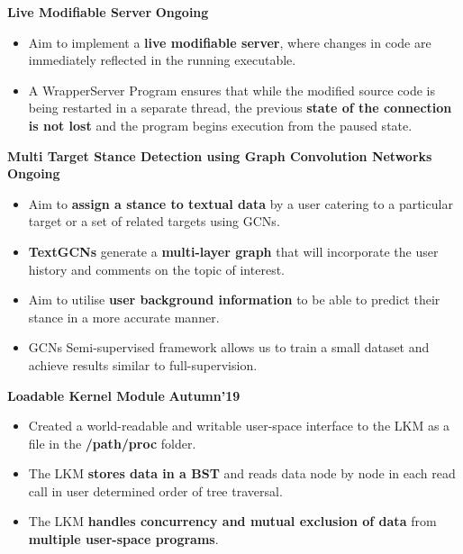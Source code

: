\documentclass[10pt]{article}
\begin{document}
\vspace{-0.5ex}
\spacedhrule{0.15ex}{1.0ex}
\large {\textbf{Live Modifiable Server}} \normalsize \href{}{} {\hfill} \textbf{Ongoing}\\[-1.75em]
\begin{itemize}
    \item Aim to implement a \textbf{live modifiable server}, where changes in code are immediately reflected in the running executable.\\[-1.9em]
    \item A WrapperServer Program ensures that while the modified source code is being restarted in a separate thread, the previous \textbf{state of the connection is not lost} and the program begins execution from the paused state.\\[-1em]
\end{itemize}
\large {\textbf{Multi Target Stance Detection using Graph Convolution Networks}} \normalsize \href{}{} {\hfill} \textbf{Ongoing}\\[-1.75em]
\begin{itemize}
    \item Aim to \textbf{assign a stance to textual data} by a user catering to a particular target or a set of related targets using GCNs.\\[-1.9em]
    \item \textbf{TextGCNs} generate a \textbf{multi-layer graph} that will incorporate the user history and comments on the topic of interest.\\[-1.9em]
    \item Aim to utilise \textbf{user background information} to be able to predict their stance in a more accurate manner.\\[-1.9em]
    \item GCNs {Semi-supervised framework} allows us to train a small dataset and achieve results similar to full-supervision.\\[-1em]
\end{itemize}
\large {\textbf{Loadable Kernel Module}} \normalsize \href{https://github.com/shmundhra/Systems-Programming/blob/master/LKM/LKM_BST.pdf} {\hspace{0.5ex}\faGithub} {\hfill} \textbf{Autumn'19}\\[-1.75em]
\begin{itemize}
    \item Created a world-readable and writable user-space interface to the LKM as a file in the \textbf{/path/proc} folder. \\[-1.9em]
    \item The LKM \textbf{stores data in a BST} and reads data node by node in each read call in user determined order of tree traversal. \\[-1.9em]
    \item The LKM \textbf{handles concurrency and mutual exclusion of data} from \textbf{multiple user-space programs}.\\[-1em]
\end{itemize}
\end{document}
